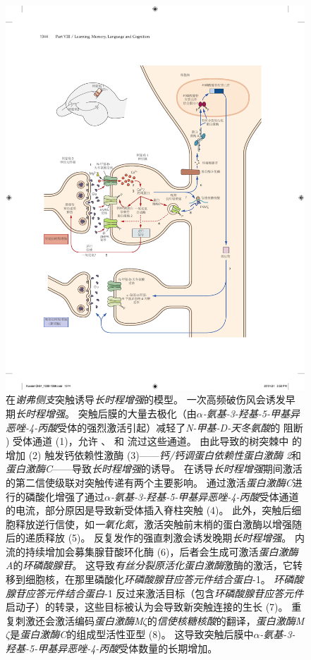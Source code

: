\begin{figure}[htbp]
	\centering
	\includegraphics[width=0.9\linewidth]{chap54/fig_54_3}
	\caption{在\textit{谢弗侧支}突触诱导\textit{长时程增强}的模型。
		一次高频破伤风会诱发早期\textit{长时程增强}。
		突触后膜的大量去极化（由\textit{$\alpha$-氨基-3-羟基-5-甲基异恶唑-4-丙酸}受体的强烈激活引起）减轻了\textit{N-甲基-D-天冬氨酸}的  阻断 ) 受体通道 (1)，允许 、 和  流过这些通道。
		由此导致的树突棘中  的增加 (2) 触发钙依赖性激酶 (3)——\textit{钙/钙调蛋白依赖性蛋白激酶 2}和\textit{蛋白激酶C}——导致\textit{长时程增强}的诱导。
		在诱导\textit{长时程增强}期间激活的第二信使级联对突触传递有两个主要影响。
		通过激活\textit{蛋白激酶C}进行的磷酸化增强了通过\textit{$\alpha$-氨基-3-羟基-5-甲基异恶唑-4-丙酸}受体通道的电流，部分原因是导致新受体插入脊柱突触 (4)。
		此外，突触后细胞释放逆行信使，如\textit{一氧化氮}，激活突触前末梢的蛋白激酶以增强随后的递质释放 (5)。
		反复发作的强直刺激会诱发晚期\textit{长时程增强}。
		 内流的持续增加会募集腺苷酸环化酶 (6)，后者会生成可激活\textit{蛋白激酶A}的\textit{环磷酸腺苷}。
		这导致\textit{有丝分裂原活化蛋白激酶}激酶的激活，它转移到细胞核，在那里磷酸化\textit{环磷酸腺苷应答元件结合蛋白}-1。
		\textit{环磷酸腺苷应答元件结合蛋白}-1 反过来激活目标（包含\textit{环磷酸腺苷应答元件}启动子）的转录，这些目标被认为会导致新突触连接的生长 (7)。
		重复刺激还会激活编码\textit{蛋白激酶M$\zeta$}的\textit{信使核糖核酸}的翻译，\textit{蛋白激酶M$\zeta$}是\textit{蛋白激酶C}的组成型活性亚型 (8)。
		这导致突触后膜中\textit{$\alpha$-氨基-3-羟基-5-甲基异恶唑-4-丙酸}受体数量的长期增加。}
	\label{fig:54_3}
\end{figure}


